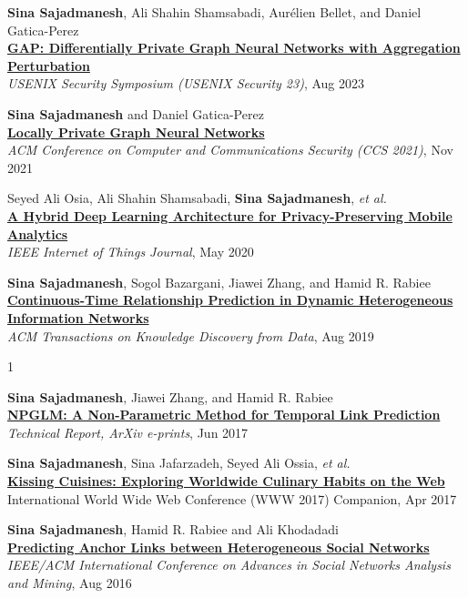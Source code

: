 \documentclass[8pt]{article}
\def\longversion{1}  %
\begin{document}
\begin{bibenum}
	\item{} \textbf{Sina Sajadmanesh}, Ali Shahin Shamsabadi, Aurélien Bellet, and Daniel Gatica-Perez\\
	\href{https://arxiv.org/abs/2203.00949}{\textbf{GAP: Differentially Private Graph Neural Networks with Aggregation Perturbation}}\\
	\textit{USENIX Security Symposium (USENIX Security 23)}, Aug 2023

	\item{} \textbf{Sina Sajadmanesh} and Daniel Gatica-Perez\\
	\href{https://arxiv.org/abs/2006.05535}{\textbf{Locally Private Graph Neural Networks}}\\
	\textit{ACM Conference on Computer and Communications Security (CCS 2021)}, Nov 2021

	\item{} Seyed Ali Osia, Ali Shahin Shamsabadi, \textbf{Sina Sajadmanesh}, \textit{et al.}\\
	\href{https://arxiv.org/abs/1703.02952}{\textbf{A Hybrid Deep Learning Architecture for Privacy-Preserving Mobile Analytics}}\\
	\textit{IEEE Internet of Things Journal}, May 2020
	
	\item{} \textbf{Sina Sajadmanesh}, Sogol Bazargani, Jiawei Zhang, and Hamid R. Rabiee\\
	\href{https://arxiv.org/abs/1710.00818}{\textbf{Continuous-Time Relationship Prediction in Dynamic Heterogeneous Information Networks}}\\
	\textit{ACM Transactions on Knowledge Discovery from Data}, Aug 2019
	
	\if\longversion1
	\item{} \textbf{Sina Sajadmanesh}, Jiawei Zhang, and Hamid R. Rabiee\\
	\href{https://arxiv.org/abs/1706.06783}{\textbf{NPGLM: A Non-Parametric Method for Temporal Link Prediction}}\\
	\textit{Technical Report, ArXiv e-prints}, Jun 2017
	\fi

	\item{} \textbf{Sina Sajadmanesh}, Sina Jafarzadeh, Seyed Ali Ossia, \textit{et al.}\\
	\href{https://arxiv.org/pdf/1610.08469}{\textbf{Kissing Cuisines: Exploring Worldwide Culinary Habits on the Web}}\\
	International World Wide Web Conference (WWW 2017) Companion, Apr 2017
	
	\item{} \textbf{Sina Sajadmanesh}, Hamid R. Rabiee and Ali Khodadadi\\
	\href{https://arxiv.org/pdf/1607.08821}{\textbf{Predicting Anchor Links between Heterogeneous Social Networks}}\\
	\textit{IEEE/ACM International Conference on Advances in Social Networks Analysis and Mining},  Aug 2016
	
\end{bibenum}
\end{document}
